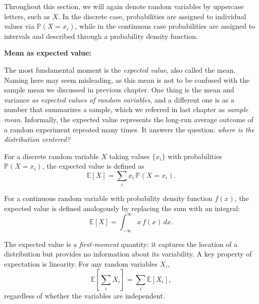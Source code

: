 \medskip

Throughout this section, we will again denote random variables by uppercase letters, such as $X$. In the discrete case, probabilities are assigned to individual values via $\mathbb{P}(X = x_i)$, while in the continuous case probabilities are assigned to intervals and described through a probability density function.

\medskip

\textbf{Mean as expected value:}  

\medskip

The most fundamental moment is the \textit{expected value}, also called the mean. Naming here may seem misleading, as this mean is not to be confused with the sample mean we discussed in previous chapter. One thing is the mean and variance \textit{as expected values of random variables}, and a different one is as a number that summarizes a sample, which we referred in last chapter as \textit{sample mean}. Informally, the expected value represents the long-run average outcome of a random experiment repeated many times. It answers the question: \textit{where is the distribution centered?}

\medskip

For a discrete random variable $X$ taking values $\{x_i\}$ with probabilities $\mathbb{P}(X=x_i)$, the expected value is defined as
\begin{equation}
    \mathbb{E}[X]=\sum_i x_i\,\mathbb{P}(X=x_i).
\end{equation}

\medskip

For a continuous random variable with probability density function $f(x)$, the expected value is defined analogously by replacing the sum with an integral:
\begin{equation}
    \mathbb{E}[X]=\int_{-\infty}^{\infty} x\,f(x)\,dx.
\end{equation}

\medskip

The expected value is a \textit{first-moment} quantity: it captures the location of a distribution but provides no information about its variability. A key property of expectation is linearity. For any random variables $X_i$,
\begin{equation}
    \mathbb{E}\!\left[\sum_i X_i\right]=\sum_i \mathbb{E}[X_i],
\end{equation}
regardless of whether the variables are independent.

\medskip

